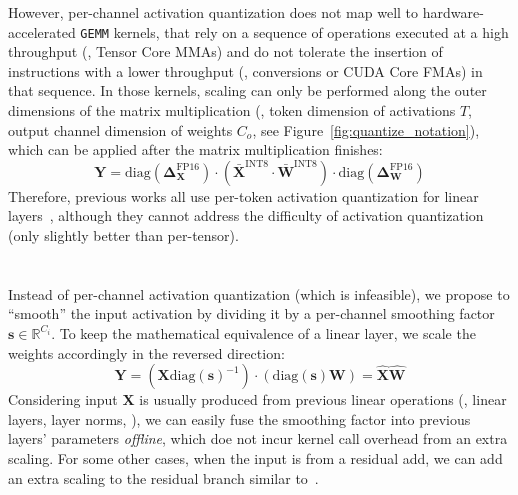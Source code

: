 However, per-channel activation quantization does not map well to hardware-accelerated \texttt{GEMM} kernels, that rely on a sequence of operations executed at a high throughput (\eg, Tensor Core MMAs) and do not tolerate the insertion of instructions with a lower throughput (\eg, conversions or CUDA Core FMAs) in that sequence. In those kernels, scaling can only be performed along the outer dimensions of the matrix multiplication (\ie, token dimension of activations $T$, output channel dimension of weights $C_o$, see Figure~\ref{fig:quantize_notation}), which can be applied after the matrix multiplication finishes:
\begin{equation}
    \mathbf{Y} = \text{diag}(\mathbf{\Delta}_{\mathbf{X}}^{\text{FP16}}) \cdot (\mathbf{\bar{X}}^{\text{INT8}}\cdot \mathbf{\bar{W}}^{\text{INT8}}) \cdot \text{diag}(\mathbf{\Delta}_{\mathbf{W}}^{\text{FP16}})
\end{equation}
Therefore, previous works all use per-token activation quantization for linear layers~\cite{dettmers2022llmint8, zeroquant}, although they cannot address the difficulty of activation quantization (only slightly better than per-tensor).

\section{\method}
Instead of per-channel activation quantization (which is infeasible), we propose to ``smooth'' the input activation by dividing it by a per-channel smoothing factor $\mathbf{s}\in\mathbb{R}^{C_i}$. To keep the mathematical equivalence of a linear layer, we scale the weights accordingly in the reversed direction:
\begin{equation}
    \mathbf{Y} = (\mathbf{X}\text{diag}(\mathbf{s})^{-1}) \cdot(\text{diag}(\mathbf{s})\mathbf{W}) = \hat{\mathbf{X}} \hat{\mathbf{W}}
\end{equation}
Considering input $\mathbf{X}$ is usually produced from previous linear operations (\eg, linear layers, layer norms, \etc), we can easily fuse the smoothing factor into previous layers' parameters \textit{offline}, which doe not incur kernel call overhead from an extra scaling. For some other cases, when the input is from a residual add, we can add an extra scaling to the residual branch similar to~\citet{outlier_suppression}.

